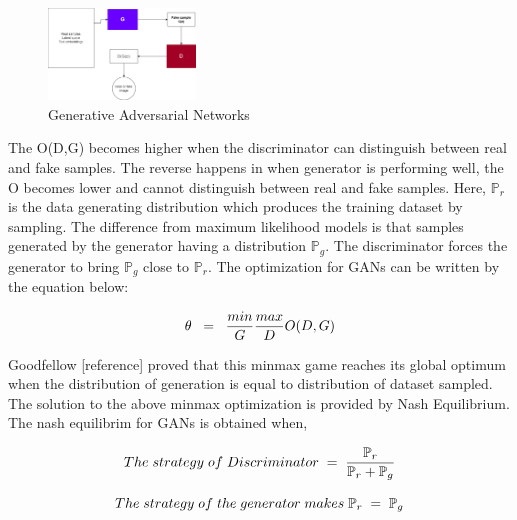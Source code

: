 \documentclass[conference]{IEEEtran}
\begin{document}
	\begin{figure}[htbp]
		\centering
		\includegraphics[width=0.35\textwidth]{GANS_final.png}
		\caption{Generative Adversarial Networks}
		\label{gan}
	\end{figure}
	
	The O(D,G) becomes higher when the discriminator can distinguish between real and fake samples. The reverse happens in when generator is performing well, the O becomes lower and cannot distinguish between real and fake samples. Here, $\mathbb{P}_r$ is the data generating distribution which produces the training dataset by sampling. The difference from maximum likelihood models is that samples generated by the generator having a distribution $\mathbb{P}_g$. The discriminator forces the generator to bring $\mathbb{P}_g$ close to $\mathbb{P}_r$. The optimization for GANs can be written by the equation below:
	
	\begin{equation}
	\theta \hspace{0.2cm} = \hspace{0.2cm} \frac{min}{G} \frac{max}{D} O(D, G)  
	\end{equation}
	
	Goodfellow [reference] proved that this minmax game reaches its global optimum when the distribution of generation is equal to distribution of dataset sampled. The solution to the above minmax optimization is provided by Nash Equilibrium. The nash equilibrim for GANs is obtained when,
	
	\[The \hspace{0.1cm} strategy \hspace{0.1cm} of \hspace{0.1cm} Discriminator \hspace{0.1cm} = \hspace{0.1cm} \frac{\mathbb{P}_r}{\mathbb{P}_r + \mathbb{P}_g} \]
	
	\[The \hspace{0.1cm} strategy \hspace{0.1cm} of \hspace{0.1cm} the \hspace{0.1cm} generator \hspace{0.1cm} makes \hspace{0.1cm} \mathbb{P}_r \hspace{0.1cm} = \hspace{0.1cm} \mathbb{P}_g\]
	
\end{document}

